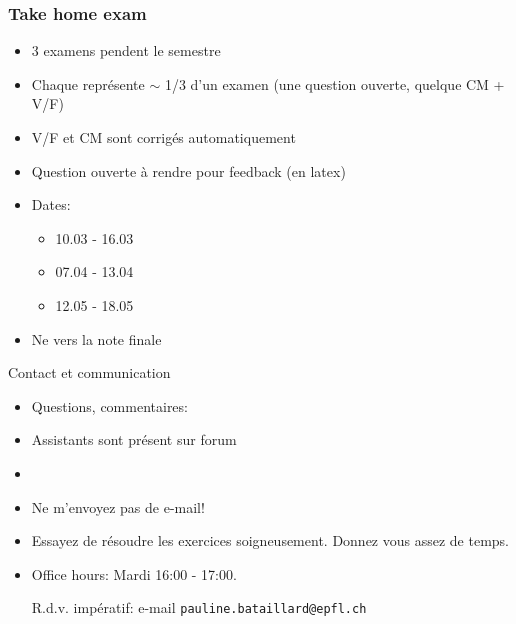     \begin{frame}
     \frametitle{Take home exam} 
     \begin{itemize}
     \item 3 examens  pendent le semestre
     \item Chaque représente $∼$ 1/3 d'un examen (une question ouverte, quelque CM + V/F)
     \item V/F et CM sont corrigés automatiquement
     \item Question ouverte à rendre pour feedback (en latex)   
     \item Dates:
       \begin{itemize}
       \item 10.03 - 16.03
       \item 07.04 - 13.04
       \item 12.05 - 18.05
       \end{itemize}
     \item Ne  vers la note finale 
     \end{itemize}
   \end{frame}


   
   \begin{frame}{Contact et communication}

     \begin{itemize}
     \item Questions, commentaires: 
     \item Assistants sont présent sur forum 
     \item {} 
     \item Ne m'envoyez pas de  e-mail!
     \item Essayez de résoudre les exercices soigneusement. Donnez vous assez de temps. 
     \item Office hours: Mardi 16:00 - 17:00.

       
      R.d.v. impératif: e-mail  {\tt pauline.bataillard@epfl.ch  }
     \end{itemize}
     
   \end{frame}


   

